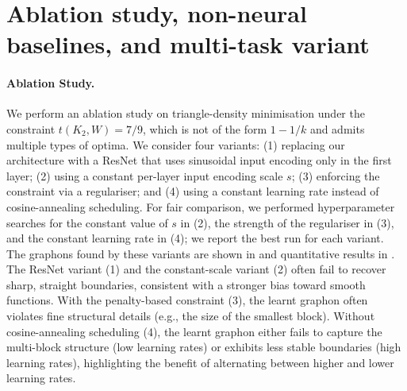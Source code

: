\documentclass{article}
\theoremstyle{plain}
\theoremstyle{definition}
\theoremstyle{remark}
\begin{document}
\section{Ablation study, non-neural baselines, and multi-task variant}
\label{sec:ablation}

\paragraph{Ablation Study.}
We perform an ablation study on triangle-density minimisation under the constraint $t(K_2,W)=7/9$, which is not of the form $1-1/k$ and admits multiple types of optima.
We consider four variants: (1) replacing our architecture with a ResNet that uses sinusoidal input encoding only in the first layer; (2) using a constant per-layer input encoding scale $s$; (3) enforcing the constraint via a regulariser; and (4) using a constant learning rate instead of cosine-annealing scheduling.
For fair comparison, we performed hyperparameter searches for the constant value of $s$ in (2), the strength of the regulariser in (3), and the constant learning rate in (4); we report the best run for each variant.
The graphons found by these variants are shown in  and quantitative results in .
The ResNet variant (1) and the constant-scale variant (2) often fail to recover sharp, straight boundaries, consistent with a stronger bias toward smooth functions.
With the penalty-based constraint (3), the learnt graphon often violates fine structural details (e.g., the size of the smallest block).
Without cosine-annealing scheduling (4), the learnt graphon either fails to capture the multi-block structure (low learning rates) or exhibits less stable boundaries (high learning rates), highlighting the benefit of alternating between higher and lower learning rates.
\end{document}
